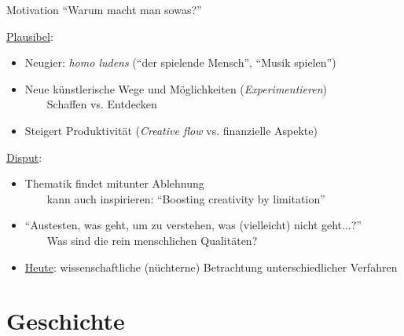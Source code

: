 \begin{frame}[t]{Motivation}
{\enquote{Warum macht man sowas?}}

	
	\underline{Plausibel}:
	\begin{itemize}
		\item Neugier: \emph{homo ludens} (\enquote{der spielende Mensch}, \enquote{Musik spielen}) %
		\item Neue künstlerische Wege und Möglichkeiten (\emph{Experimentieren})\\
		~~~\conclude~Schaffen vs. Entdecken \citep[S.591]{MDABook}
		\item Steigert Produktivität (\emph{Creative flow} vs. finanzielle Aspekte)
	\end{itemize}
	\smallskip
	
	\underline{Disput}:
	\begin{itemize}
		\item Thematik findet mitunter Ablehnung\\
		~~~\conclude~kann auch inspirieren: \enquote{Boosting creativity by limitation}
		\item \enquote{Austesten, was geht, um zu verstehen, was (vielleicht) nicht geht...?} \\
		~~~\conclude~Was sind die rein menschlichen Qualitäten?
		\medskip
		\item[\Conclude] \underline{Heute}: wissenschaftliche (nüchterne) Betrachtung unterschiedlicher Verfahren
	\end{itemize}
	
\end{frame}

\section{Geschichte}


